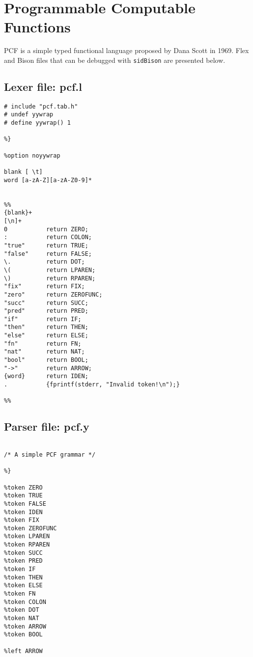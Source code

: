 \begin{appendices}
\begin{Verbatim}[frame=single]
\end{Verbatim}


\section{Programmable Computable Functions}

PCF is a simple typed functional language proposed by Dana Scott in 1969.  Flex and Bison files that can be debugged with \verb|sidBison| are presented below.

\subsection{Lexer file: pcf.l}

\begin{Verbatim}[frame=single]
%{
# include "pcf.tab.h"
# undef yywrap
# define yywrap() 1

%}

%option noyywrap

blank [ \t]
word [a-zA-Z][a-zA-Z0-9]*


%%
{blank}+
[\n]+
0           return ZERO;
:           return COLON;
"true"      return TRUE;
"false"     return FALSE;
\.          return DOT;
\(          return LPAREN;
\)          return RPAREN;
"fix"       return FIX;
"zero"      return ZEROFUNC;
"succ"      return SUCC;
"pred"      return PRED;
"if"        return IF;
"then"      return THEN;
"else"      return ELSE;
"fn"        return FN;
"nat"       return NAT;
"bool"      return BOOL;
"->"        return ARROW;
{word}      return IDEN;
.           {fprintf(stderr, "Invalid token!\n");}

%%
\end{Verbatim}

\subsection{Parser file: pcf.y}

\begin{Verbatim}[frame=single]
%{

/* A simple PCF grammar */

%}

%token ZERO
%token TRUE
%token FALSE
%token IDEN
%token FIX
%token ZEROFUNC
%token LPAREN
%token RPAREN
%token SUCC
%token PRED
%token IF
%token THEN
%token ELSE
%token FN
%token COLON
%token DOT
%token NAT
%token ARROW
%token BOOL

%left ARROW


\end{Verbatim}
\end{appendices}
